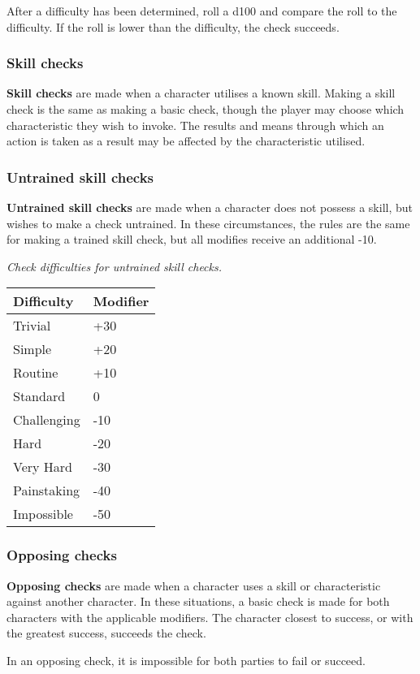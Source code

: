 \documentclass[12pt,]{article}
\begin{document}
After a difficulty has been determined, roll a d100 and compare the roll
to the difficulty. If the roll is lower than the difficulty, the check
succeeds.

\subsubsection{Skill checks}\label{skill-checks}

\textbf{Skill checks} are made when a character utilises a known skill.
Making a skill check is the same as making a basic check, though the
player may choose which characteristic they wish to invoke. The results
and means through which an action is taken as a result may be affected
by the characteristic utilised.

\subsubsection{Untrained skill checks}\label{untrained-skill-checks}

\textbf{Untrained skill checks} are made when a character does not
possess a skill, but wishes to make a check untrained. In these
circumstances, the rules are the same for making a trained skill check,
but all modifies receive an additional -10.

\emph{Check difficulties for untrained skill checks.}

\begin{longtable}[]{@{}ll@{}}
\toprule
Difficulty & Modifier\tabularnewline
\midrule
\endhead
Trivial & +30\tabularnewline
Simple & +20\tabularnewline
Routine & +10\tabularnewline
Standard & 0\tabularnewline
Challenging & -10\tabularnewline
Hard & -20\tabularnewline
Very Hard & -30\tabularnewline
Painstaking & -40\tabularnewline
Impossible & -50\tabularnewline
\bottomrule
\end{longtable}

\subsubsection{Opposing checks}\label{opposing-checks}

\textbf{Opposing checks} are made when a character uses a skill or
characteristic against another character. In these situations, a basic
check is made for both characters with the applicable modifiers. The
character closest to success, or with the greatest success, succeeds the
check.

In an opposing check, it is impossible for both parties to fail or
succeed.
\end{document}
